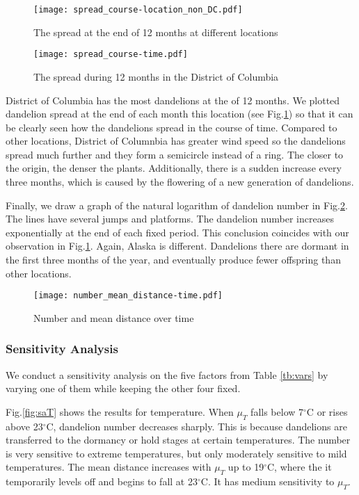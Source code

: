 \documentclass[12pt]{article}
\begin{document}
			\begin{figure}[htbp]
				\centering
				\texttt{[image: spread\_course-location\_non\_DC.pdf]}
				\caption{The spread at the end of 12 months at different locations}
				\label{fig:scatter5loc}
				
				\vspace{1cm}

				\texttt{[image: spread\_course-time.pdf]}
				\caption{The spread during 12 months in the District of Columbia}
				\label{fig:spreadDC}
			\end{figure}
			\newpage
			
			District of Columbia has the most dandelions at the of 12 months.  We plotted dandelion spread at the end of each month this location (see Fig.\ref{fig:spreadDC}) so that it can be clearly seen how the dandelions spread in the course of time.  Compared to other locations, District of Columnbia has greater wind speed so the dandelions spread much further and they form a semicircle instead of a ring.  The closer to the origin, the denser the plants.  Additionally, there is a sudden increase every three months, which is caused by the flowering of a new generation of dandelions.
			
			Finally, we draw a graph of the natural logarithm of dandelion number in Fig.\ref{fig:time}.  The lines have several jumps and platforms.  The dandelion number increases exponentially at the end of each fixed period.  This conclusion coincides with our observation in Fig.\ref{fig:spreadDC}.  Again, Alaska is different.  Dandelions there are dormant in the first three months of the year, and eventually produce fewer offspring than other locations.
			
			\begin{figure}[htbp]
				\centering
				\texttt{[image: number\_mean\_distance-time.pdf]}
				\caption{Number and mean distance over time}
				\label{fig:time}
			\end{figure}
		
		
		
		\subsubsection{Sensitivity Analysis}
			
			We conduct a sensitivity analysis on the five factors from Table \ref{tb:vars} by varying one of them while keeping the other four fixed.  
			
			Fig.\ref{fig:saT} shows the results for temperature.  When $\mu_T$ falls below 7$^\circ$C or rises above 23$^\circ$C, dandelion number decreases sharply.  This is because dandelions are transferred to the dormancy or hold stages at certain temperatures.  The number is very sensitive to extreme temperatures, but only moderately sensitive to mild temperatures.  The mean distance increases with $\mu_T$ up to 19$^\circ$C, where the it temporarily levels off and begins to fall at 23$^\circ$C.  It has medium sensitivity to $\mu_T$.
			
\end{document}
